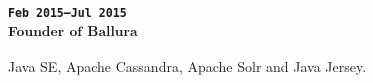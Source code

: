 \subsubsection{
\textsubscript{
\uppercase{\texttt{Feb 2015--Jul 2015}}\\
Founder of Ballura
}
}
Java SE, Apache Cassandra, Apache Solr and Java Jersey.
